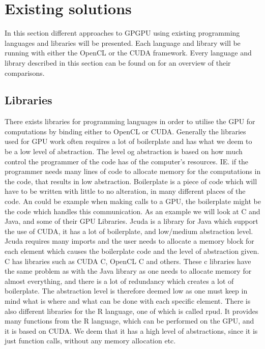 \section{Existing solutions} %
\label{sec:state_of_the_art}
In this section different approaches to GPGPU using existing programming languages and libraries will be presented.
Each language and library will be running with either the OpenCL or the CUDA framework.
Every language and library described in this section can be found on  for an overview of their comparisons.
      
\subsection{Libraries} 
There exists libraries for programming languages in order to utilise the GPU for computations by binding either to OpenCL or CUDA.
Generally the libraries used for GPU work often requires a lot of boilerplate and has what we deem to be a low level of abstraction.
The level og abstraction is based on how much control the programmer of the code has of the computer's resources.
IE. if the programmer needs many lines of code to allocate memory for the computations in the code, that results in low abstraction.
Boilerplate is a piece of code which will have to be written with little to no alteration, in many different places of the code.
An could be example when making calls to a GPU, the boilerplate might be the code which handles this communication.
As an example we will look at C and Java, and some of their GPU Libraries.
Jcuda is a library for Java which support the use of CUDA, it has a lot of boilerplate, and low/medium abstraction level\citep{Java_library}. 
Jcuda requires many imports and the user needs to allocate a memory block for each element which causes the boilerplate code and the level of abstraction given.\citep{Java_malloc}
C has libraries such as CUDA C, OpenCL C and others.
These c libraries have the same problem as with the Java library as one needs to allocate memory for almost everything, and there is a lot of redundancy which creates a lot of boilerplate.
The abstraction level is therefore deemed low as one must keep in mind what is where and what can be done with each specific element.\citep{C_CUDA} 
There is also different libraries for the R language, one of which is called rpud.
It provides many functions from the R language, which can be performed on the GPU, and it is based on CUDA.
We deem that it has a high level of abstractions, since it is just function calls, without any memory allocation etc.\citep{Rcuda}                                                 

